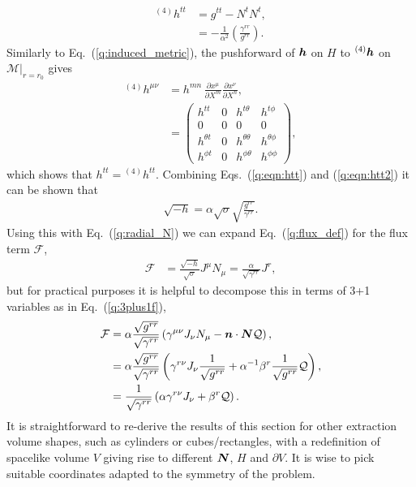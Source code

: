 \begin{align}
{}^{(4)}h^{tt} &=      g^{tt} - N^t N^t, \\
\label{q:eqn:htt2}&= -\frac{1}{\alpha^2}\left(\frac{\gamma^{rr}}{g^{rr}} \right).
\end{align}
Similarly to Eq.~(\ref{q:induced_metric}), the pushforward of $\boldsymbol h$ on $H$ to ${}^{(4)}\boldsymbol h$ on $\mathcal{M}\vert_{r=r_0}$ gives
\begin{align}
{}^{(4)} h^{\mu\nu}  &= h^{mn}\,\frac{\partial x^\mu}{\partial X^m} \frac{\partial x^\nu}{\partial X^n}, \\
 &= \begin{pmatrix} h^{tt}&0&h^{t\theta }&h^{t\phi} \\ 0&0&0&0 \\ h^{\theta t}&0&h^{\theta \theta }&h^{\theta \phi} \\ h^{\phi t}&0&h^{\phi\theta }&h^{\phi\phi} \end{pmatrix},
\end{align}
which shows that $h^{tt}={}^{(4)}h^{tt}$. Combining Eqs.~(\ref{q:eqn:htt}) and (\ref{q:eqn:htt2}) it can be shown that
\begin{align}
     \label{q:rootminushexpand}\sqrt{-h} = \alpha \sqrt{\sigma} \sqrt{\frac{g^{rr}}{\gamma^{rr}}}.
\end{align}
Using this with Eq.~(\ref{q:radial_N}) we can expand Eq.~(\ref{q:flux_def}) for the flux term $\mathcal{F}$,
\begin{align}
 \label{q:spherical_flux}\mathcal{F}&=  \frac{\sqrt{-h}}{\sqrt{\sigma}} J^\mu N_\mu = \frac{\alpha}{\sqrt{\gamma^{rr}}} J^r,
 \end{align}
 but for practical purposes it is helpful to decompose this in terms of 3+1 variables as in Eq.~(\ref{q:3plus1f}),
 \begin{align}
   \mathcal{F} &= \alpha\frac{\sqrt{g^{rr}}}{\sqrt{\gamma^{rr}}} \left(\gamma^{\mu\nu}J_\nu {N}_\mu - \boldsymbol{n} \cdot \boldsymbol{N} \mathcal{Q}\right), \\
                   &=  \alpha\frac{\sqrt{g^{rr}}}{\sqrt{\gamma^{rr}}}\left(\gamma^{r\nu}J_\nu \frac{1}{\sqrt{g^{rr}}} +\alpha^{-1}\beta^r\frac{1}{\sqrt{g^{rr}}} \mathcal{Q}\right), \\
\label{q:3plus1fluxspherical}   &= \frac{1}{\sqrt{\gamma^{rr}}}\left(\alpha\gamma^{r\nu}J_\nu  + \beta^r \mathcal{Q}\right).
\end{align}
It is straightforward to re-derive the results of this section for other extraction volume shapes, such as cylinders or cubes/rectangles, with a redefinition of spacelike volume $V$ giving rise to different $\boldsymbol{N}$, $H$ and $\partial V$. It is wise to pick suitable coordinates adapted to the symmetry of the problem.











